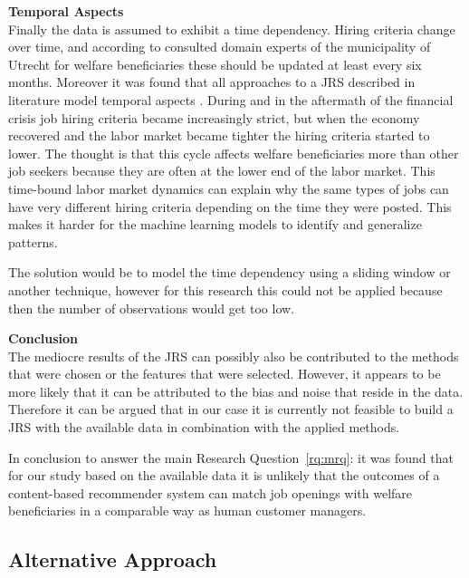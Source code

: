 \noindent
\textbf{Temporal Aspects} \\
Finally the data is assumed to exhibit a time dependency.
Hiring criteria change over time, and according to consulted domain experts of the municipality of Utrecht for welfare beneficiaries these should be updated at least every six months. 
Moreover it was found that all approaches to a JRS described in literature model temporal aspects  \cite{kenthapadi2017personalized, T.Al-Otaibi2012ASystems, Zheng2012JobSurvey, hong2013job}.
During and in the aftermath of the financial crisis job hiring criteria became increasingly strict, but when the economy recovered and the labor market became tighter the hiring criteria started to lower. 
The thought is that this cycle affects welfare beneficiaries more than other job seekers because they are often at the lower end of the labor market.
This time-bound labor market dynamics can explain why the same types of jobs can have very different hiring criteria depending on the time they were posted.
This makes it harder for the machine learning models to identify and generalize patterns.

The solution would be to model the time dependency using a sliding window or another technique, however for this research this could not be applied because then the number of observations would get too low.  

\noindent
\textbf{Conclusion}\\
The mediocre results of the JRS can possibly also be contributed to the methods that were chosen or the features that were selected. 
However, it appears to be more likely that it can be attributed to the bias and noise that reside in the data.
Therefore it can be argued that in our case it is currently not feasible to build a JRS with the available data in combination with the applied methods. 

In conclusion to answer the main Research Question~\ref{rq:mrq}: it was found that for our study based on the available data it is unlikely that the outcomes of a content-based recommender system can match job openings with welfare beneficiaries in a comparable way as human customer managers. 

\subsection{Alternative Approach}
\label{ssec:learnings}

